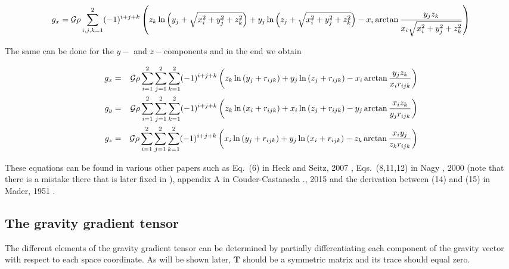 \begin{eqnarray}
g_x = 
{\cal G}  \rho \sum_{i,j,k=1}^{2} (-1)^{i+j+k}  \left( 
z_k \ln{\left( y_j + \sqrt{x_i^2+y_j^2+z_k^2} \right)} + 
y_j \ln{\left( z_j + \sqrt{x_i^2+y_j^2+z_k^2} \right)} - 
x_i \arctan{\frac{y_j z_k}{x_i \sqrt{x_i^2+y_j^2+z_k^2}}} \right) \nonumber
\end{eqnarray}

The same can be done for the $y-$ and $z-$components and in the end we obtain
\begin{mdframed}[backgroundcolor=blue!5]
\begin{eqnarray}
g_x &=& {\cal G}  \rho \displaystyle\sum_{i=1}^{2} \displaystyle\sum_{j=1}^{2} \displaystyle\sum_{k=1}^{2} (-1)^{i+j+k} 
\left( 
z_k \ln{\left( y_j + r_{ijk} \right)} + 
y_j \ln{\left( z_j + r_{ijk} \right)} - 
x_i \arctan{\frac{y_j z_k}{x_i r_{ijk}}} 
\right) \nonumber\\
g_y &=& 
{\cal G}  \rho \displaystyle\sum_{i=1}^{2} \displaystyle\sum_{j=1}^{2} \displaystyle\sum_{k=1}^{2} (-1)^{i+j+k} 
\left( 
z_k \ln{\left( x_i + r_{ijk} \right)} + 
x_i \ln{\left( z_j + r_{ijk} \right)} - 
y_j \arctan{\frac{x_i z_k}{y_j r_{ijk}}} 
\right) \nonumber\\
g_z &=& 
{\cal G}  \rho \displaystyle\sum_{i=1}^{2} \displaystyle\sum_{j=1}^{2} \displaystyle\sum_{k=1}^{2} (-1)^{i+j+k} 
\left( 
x_i \ln{\left( y_j + r_{ijk} \right)} + 
y_j \ln{\left( x_i + r_{ijk} \right)} - 
z_k \arctan{\frac{x_i y_j}{z_k r_{ijk}}} 
\right) \nonumber
\end{eqnarray}
\end{mdframed}

These equations can be found in various other papers such as Eq.~(6) in Heck and Seitz, 2007 \cite{hese07}, Eqs.~(8,11,12) in Nagy \etal, 2000 \cite{napb00} 
(note that there is a mistake there that is later fixed in \cite{napb02}), 
appendix A in Couder-Castaneda \etal., 2015 \cite{cooo15} 
and the derivation between (14) and (15) in Mader, 1951 \cite{made51}.

\subsection{The gravity gradient tensor} %

The different elements of the gravity gradient tensor can be determined by partially differentiating each component of the 
gravity vector with respect to each space coordinate. As will be shown later, ${\bm T}$ should be a symmetric matrix and its trace should equal zero.

